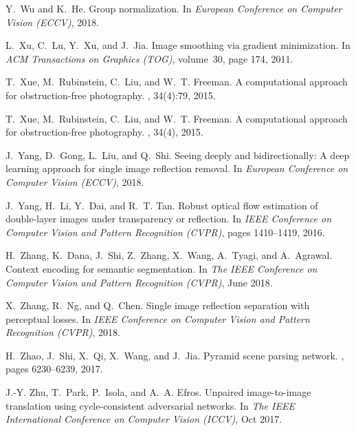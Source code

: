 \documentclass[10pt,twocolumn,letterpaper]{article}
\begin{document}
{\begin{thebibliography}{10}
Y.~Wu and K.~He.
\newblock Group normalization.
\newblock In {\em European Conference on Computer Vision (ECCV)}, 2018.

L.~Xu, C.~Lu, Y.~Xu, and J.~Jia.
\newblock Image smoothing via {} gradient minimization.
\newblock In {\em ACM Transactions on Graphics (TOG)}, volume~30, page 174,
  2011.

T.~Xue, M.~Rubinstein, C.~Liu, and W.~T. Freeman.
\newblock A computational approach for obstruction-free photography.
, 34(4):79, 2015.

T.~Xue, M.~Rubinstein, C.~Liu, and W.~T. Freeman.
\newblock A computational approach for obstruction-free photography.
, 34(4), 2015.

J.~Yang, D.~Gong, L.~Liu, and Q.~Shi.
\newblock Seeing deeply and bidirectionally: A deep learning approach for
  single image reflection removal.
\newblock In {\em European Conference on Computer Vision (ECCV)}, 2018.

J.~Yang, H.~Li, Y.~Dai, and R.~T. Tan.
\newblock Robust optical flow estimation of double-layer images under
  transparency or reflection.
\newblock In {\em IEEE Conference on Computer Vision and Pattern Recognition
  (CVPR)}, pages 1410--1419, 2016.

H.~Zhang, K.~Dana, J.~Shi, Z.~Zhang, X.~Wang, A.~Tyagi, and A.~Agrawal.
\newblock Context encoding for semantic segmentation.
\newblock In {\em The IEEE Conference on Computer Vision and Pattern
  Recognition (CVPR)}, June 2018.

X.~Zhang, R.~Ng, and Q.~Chen.
\newblock Single image reflection separation with perceptual losses.
\newblock In {\em IEEE Conference on Computer Vision and Pattern Recognition
  (CVPR)}, 2018.

H.~Zhao, J.~Shi, X.~Qi, X.~Wang, and J.~Jia.
\newblock Pyramid scene parsing network.
, pages 6230--6239, 2017.

J.-Y. Zhu, T.~Park, P.~Isola, and A.~A. Efros.
\newblock Unpaired image-to-image translation using cycle-consistent
  adversarial networks.
\newblock In {\em The IEEE International Conference on Computer Vision (ICCV)},
  Oct 2017.
\end{thebibliography}

}
\end{document}
